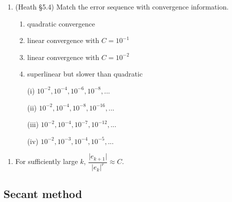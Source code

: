 \documentclass[12pt,letterpaper,noanswers]{exam}
\begin{document}
   \begin{enumerate}[resume]
    \item (Heath \S 5.4) Match the error sequence with convergence information.
    
    \begin{enumerate}
    \item quadratic convergence
    \item linear convergence with $C = 10^{-1}$
    \item linear convergence with $C = 10^{-2}$
    \item superlinear but slower than quadratic
    \end{enumerate}
    
    \begin{enumerate}
    \item[(i)] $10^{-2},10^{-4},10^{-6},10^{-8},...$
    \item[(ii)] $10^{-2},10^{-4},10^{-8},10^{-16},...$
    \item[(iii)] $10^{-2},10^{-4},10^{-7},10^{-12},...$
    \item[(iv)] $10^{-2},10^{-3},10^{-4},10^{-5},...$
    \end{enumerate}
\end{enumerate}


\begin{enumerate}[resume]
\item For sufficiently large $k$, $\dfrac{\vert e_{k+1}\vert}{\vert e_k\vert^r} \approx C$.
\end{enumerate}


\subsection*{Secant method}
\end{document}
